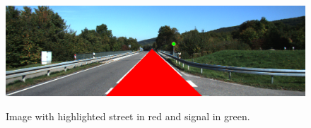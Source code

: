 \documentclass{article}
\begin{document}
\begin{figure}[h]
\begin{center}
  \includegraphics[scale=0.38]{result}\\ 
  \caption{\footnotesize{Image with highlighted street in red and signal in green.}}\label{result} 
\end{center} 
\end{figure}
\end{document}
